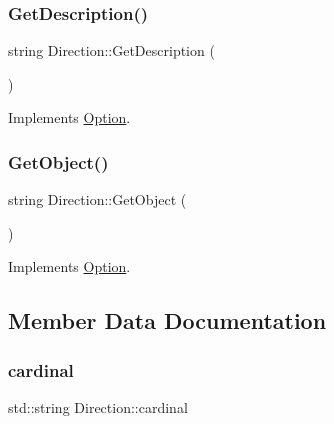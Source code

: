 \mbox{\label{class_direction_a4cc685fd6eb1cae755be2d93fab59e30}} 
\subsubsection{\texorpdfstring{Get\+Description()}{GetDescription()}}
{\footnotesize\ttfamily string Direction\+::\+Get\+Description (\begin{DoxyParamCaption}{ }\end{DoxyParamCaption})\hspace{0.3cm}{\ttfamily [virtual]}}



Implements \mbox{\hyperlink{class_option_a5e931f580c01238769c5de228666d0a5}{Option}}.

\mbox{\label{class_direction_aa2af9a792292868d283537fc94469894}} 
\subsubsection{\texorpdfstring{Get\+Object()}{GetObject()}}
{\footnotesize\ttfamily string Direction\+::\+Get\+Object (\begin{DoxyParamCaption}{ }\end{DoxyParamCaption})\hspace{0.3cm}{\ttfamily [virtual]}}



Implements \mbox{\hyperlink{class_option_ae87cbc4730a9b60734babe6b253fac0b}{Option}}.



\subsection{Member Data Documentation}
\mbox{\label{class_direction_afaa40fc2f8cbd9e9a14a9e2d80920f56}} 
\subsubsection{\texorpdfstring{cardinal}{cardinal}}
{\footnotesize\ttfamily std\+::string Direction\+::cardinal\hspace{0.3cm}{\ttfamily [protected]}}

